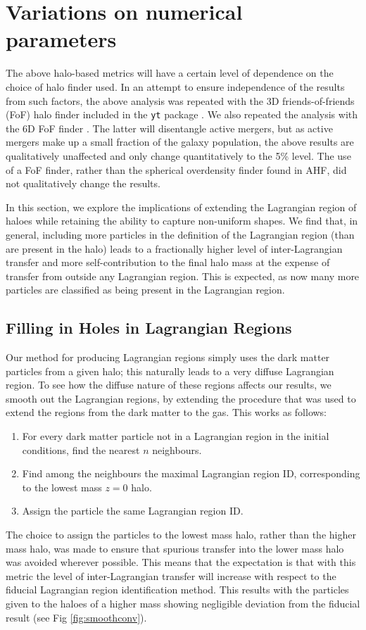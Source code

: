 \section{Variations on numerical parameters}
\label{sec:convergence}

The above halo-based metrics will have a certain level of dependence on the
choice of halo finder used. In an attempt to ensure independence of the
results from such factors, the above analysis was repeated  with the 3D
friends-of-friends (FoF) halo finder included in the {\tt yt} package
\citep{Turk2011}. We also repeated the analysis with the \velociraptor{} 6D
FoF finder \citep{Elahi2019}. The latter will disentangle active mergers, but
as active mergers make up a small fraction of the galaxy population, the
above results are qualitatively unaffected and only change quantitatively
to the 5\% level. The use of a FoF finder, rather than the spherical
overdensity finder found in AHF, did not qualitatively change the results.


In this section, we explore the implications of extending the Lagrangian
region of haloes while retaining the ability to capture non-uniform shapes. We
find that, in general, including more particles in the definition of the Lagrangian
region (than are present in the halo) leads to a fractionally higher level
of inter-Lagrangian transfer and more self-contribution to the final halo mass
at the expense of transfer from outside any Lagrangian region. This is expected, as
now many more particles are classified as being present in the Lagrangian region.


\subsection{Filling in Holes in Lagrangian Regions}

Our method for producing Lagrangian regions simply uses the dark matter
particles from a given halo; this naturally leads to a very diffuse
Lagrangian region. To see how the diffuse nature of these regions affects our
results, we smooth out the Lagrangian regions, by extending the procedure
that was used to extend the regions from the dark matter to the gas. This
works as follows:
\begin{enumerate}
	\item For every dark matter particle not in a Lagrangian region 
	      in the initial conditions, find the nearest $n$ neighbours.
	\item Find among the neighbours the maximal Lagrangian region ID,
	      corresponding to the lowest mass $z=0$ halo.
	\item Assign the particle the same Lagrangian region ID.
\end{enumerate}
The choice to assign the particles to the lowest mass halo, rather than the
higher mass halo, was made to ensure that spurious transfer into the lower mass
halo was avoided wherever possible. This means that the expectation is that
with this metric the level of inter-Lagrangian transfer will increase with
respect to the fiducial Lagrangian region identification method. This results
with the particles given to the haloes of a higher mass showing negligible
deviation from the fiducial result (see Fig \ref{fig:smoothconv}).

